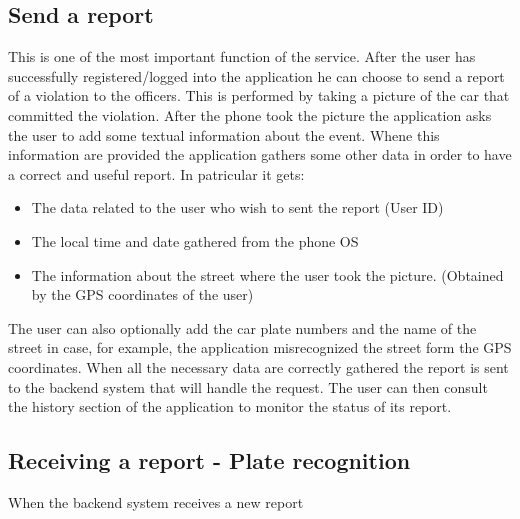 \subsection{Send a report}
This is one of the most important function of the service. After the user has successfully registered/logged into the application he can choose to send a report of a violation to the officers. This is performed by taking a picture of the car that committed the violation. After the phone took the picture the application asks the user to add some textual information about the event. Whene this information are provided the application gathers some other data in order to have a correct and useful report. In patricular it gets: 
\begin{itemize}
  \item The data related to the user who wish to sent the report (User ID)
  \item The local time and date gathered from the phone OS
  \item The information about the street where the user took the picture. (Obtained by the GPS coordinates of the user)
\end{itemize}

The user can also optionally add the car plate numbers and the name of the street in case, for example, the application misrecognized the street form the GPS coordinates. When all the necessary data are correctly gathered the report is sent to the backend system that will handle the request. The user can then consult the history section of the application to monitor the status of its report.

\subsection{Receiving a report - Plate recognition}
When the backend system receives a new report 

